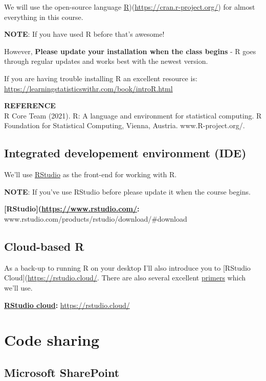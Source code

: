 \documentclass[
]{book}
\begin{document}
We will use the open-source language \protect\hyperlink{r}{R})(\url{https://cran.r-project.org/}) for almost everything in this course.

\textbf{NOTE}: If you have used R before that's awesome!

However, \textbf{Please update your installation when the class begins} - R goes through regular updates and works best with the newest version.

If you are having trouble installing R an excellent resource is:
\url{https://learningstatisticswithr.com/book/introR.html}

\textbf{REFERENCE}\\
R Core Team (2021). R: A language and environment for statistical computing. R Foundation for Statistical Computing, Vienna, Austria. www.R-project.org/.

\hypertarget{integrated-developement-environment-ide}{%
\subsection{Integrated developement environment (IDE)}\label{integrated-developement-environment-ide}}

We'll use \href{https://www.rstudio.com/}{RStudio} as the front-end for working with R.

\textbf{NOTE}: If you've use RStudio before please update it when the course begins.

\textbf{{[}RStudio{]}(\url{https://www.rstudio.com/}:} www.rstudio.com/products/rstudio/download/\#download

\hypertarget{cloud-based-r}{%
\subsection{Cloud-based R}\label{cloud-based-r}}

As a back-up to running R on your desktop I'll also introduce you to {[}RStudio Cloud{]}(\url{https://rstudio.cloud/}. There are also several excellent \href{https://rstudio.cloud/learn/primers}{primers} which we'll use.

\textbf{\href{https://rstudio.cloud/}{RStudio cloud}:} \url{https://rstudio.cloud/}

\hypertarget{code-sharing}{%
\section{Code sharing}\label{code-sharing}}

\hypertarget{microsoft-sharepoint-1}{%
\subsection{Microsoft SharePoint}\label{microsoft-sharepoint-1}}
\end{document}
